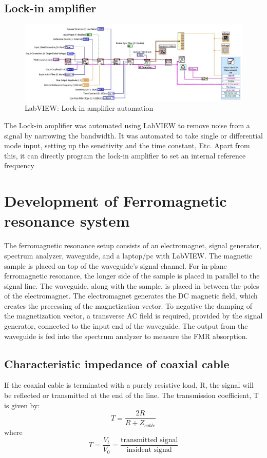 \documentclass[12pt,a4paper,bold]{thesis}
\theoremstyle{thm}
\theoremstyle{definition}
\begin{document}
\subsection{Lock-in amplifier}
\begin{figure}[H]
	\centering
   \includegraphics[width=12cm]{Images/45.png} 
   \caption{LabVIEW: Lock-in amplifier automation}
\end{figure}
The Lock-in amplifier was automated using LabVIEW to remove noise from a signal by narrowing the bandwidth. It was automated to take single or differential mode input, setting up the sensitivity and the time constant, Etc. Apart from this, it can directly program the lock-in amplifier to set an internal reference frequency
\section{Development of Ferromagnetic resonance system}
The ferromagnetic resonance setup consists of an electromagnet, signal generator, spectrum analyzer, waveguide, and a laptop/pc with LabVIEW.
The magnetic sample is placed on top of the waveguide's signal channel. For in-plane ferromagnetic resonance, the longer side of the sample is placed in parallel to the signal line. The waveguide, along with the sample, is placed in between the poles of the electromagnet. The electromagnet generates the DC magnetic field, which creates the precessing of the magnetization vector. To negative the damping of the magnetization vector, a transverse AC field is required, provided by the signal generator, connected to the input end of the waveguide. The output from the waveguide is fed into the spectrum analyzer to measure the FMR absorption. 
\subsection{Characteristic impedance of coaxial cable}
If the coaxial cable is terminated with a purely resistive load, R, the signal will be reflected or transmitted at the end of the line. The transmission coefficient, T is given by:
\[T=\frac{2R}{R+Z_{cable}}\]
where 
\[T=\frac{V_t}{V_0}=\frac{\text{transmitted signal}}{\text{insident signal}}\]
\end{document}

